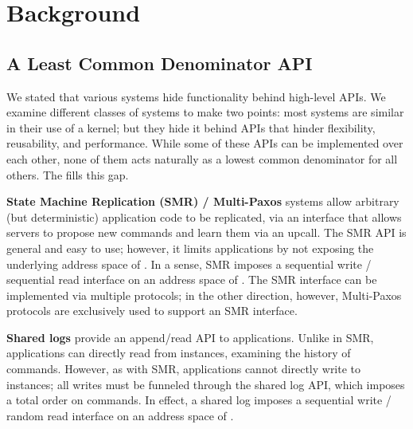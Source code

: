 \section{Background}

\subsection{A Least Common Denominator API}
\label{sec:sysbackground}


We stated that various systems hide \WOR{} functionality behind high-level APIs. We examine different classes of systems to make two points: most systems are similar in their use of a \WOR{} kernel; but they hide it behind APIs that hinder flexibility, reusability, and performance. While some of these APIs can be implemented over each other, none of them acts naturally as a lowest common denominator for all others. The \WOR{} fills this gap.


\textbf{State Machine Replication (SMR) / Multi-Paxos} systems allow arbitrary (but deterministic) application code to be replicated, via an interface that allows servers to propose new commands and learn them via an upcall. The SMR API is general and easy to use; however, it limits applications by not exposing the underlying address space of \WORs{}. In a sense, SMR imposes a sequential write / sequential read interface on an address space of \WORs{}. The SMR interface can be implemented via multiple protocols; in the other direction, however, Multi-Paxos protocols are exclusively used to support an SMR interface.%

\textbf{Shared logs} provide an append/read API to applications. Unlike in SMR, applications can directly read from \WOR{} instances, examining the history of commands. However, as with SMR, applications cannot directly write to \WOR{} instances; all writes must be funneled through the shared log API, which imposes a total order on commands. In effect, a shared log imposes a sequential write / random read interface on an address space of \WORs{}.

